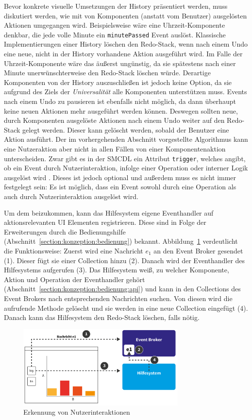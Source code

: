\documentclass[
	headsepline,
	footsepline,
	fontsize=12pt,
	bibliography=totoc
]{scrbook}
\begin{document}
Bevor konkrete visuelle Umsetzungen der History präsentiert werden, muss diskutiert werden, wie mit von Komponenten (anstatt vom Benutzer) ausgelösten Aktionen umgegangen wird. Beispielsweise wäre eine Uhrzeit-Komponente denkbar, die jede volle Minute ein \texttt{minutePassed} Event auslöst. Klassische Implementierungen einer History löschen den Redo-Stack, wenn nach einem Undo eine neue, nicht in der History vorhandene Aktion ausgeführt wird. Im Falle der Uhrzeit-Komponente wäre das äußerst ungünstig, da sie spätestens nach einer Minute unerwünschterweise den Redo-Stack löschen würde. Derartige Komponenten von der History auszuschließen ist jedoch keine Option, da sie aufgrund des Ziels der \textit{Universalität} alle Komponenten unterstützen muss. Events nach einem Undo zu pausieren ist ebenfalls nicht möglich, da dann überhaupt keine neuen Aktionen mehr ausgeführt werden können. Deswegen sollten neue, durch Komponenten ausgelöste Aktionen nach einem Undo weiter auf den Redo-Stack gelegt werden. Dieser kann gelöscht werden, sobald der Benutzer eine Aktion ausführt. Der im vorhergehenden Abschnitt vorgestellte Algorithmus kann eine Nutzeraktion aber nicht in allen Fällen von einer Komponentenaktion unterscheiden. Zwar gibt es in der SMCDL ein Attribut \texttt{trigger}, welches angibt, ob ein Event durch Nutzerinteraktion, infolge einer Operation oder interner Logik ausgelöst wird \cite[S. 98]{Pietschmann2012}. Dieses ist jedoch optional und außerdem muss es nicht immer festgelegt sein: Es ist möglich, dass ein Event sowohl durch eine Operation als auch durch Nutzerinteraktion ausgelöst wird.

Um dem beizukommen, kann das Hilfesystem eigene Eventhandler auf aktionsrelevanten UI Elementen registrieren. Diese sind in Folge der Erweiterungen durch die Bedienungshilfe (Abschnitt~\ref{section:konzeption:bedienung}) bekannt. Abbildung~\ref{figure:undo-ablauf} verdeutlicht die Funktionsweise: Zuerst wird eine Nachricht $e_1$ an den Event Broker gesendet (1). Dieser fügt sie einer Collection hinzu (2). Danach wird der Eventhandler des Hilfesystems aufgerufen (3). Das Hilfesystem weiß, zu welcher Komponente, Aktion und Operation der Eventhandler gehört (Abschnitt~\ref{section:konzeption:bedienung:api}) und kann in den Collections des Event Brokers nach entsprechenden Nachrichten suchen. Von diesen wird die aufrufende Methode gelöscht und sie werden in eine neue Collection eingefügt (4). Danach kann das Hilfesystem den Redo-Stack löschen, falls nötig.

\begin{figure}[htbp]
   \centering
   \includegraphics[width=0.75\textwidth]{images/konzeption-undo-ablauf.png}
   \caption{Erkennung von Nutzerinteraktionen}
   \label{figure:undo-ablauf}
\end{figure}
\end{document}
